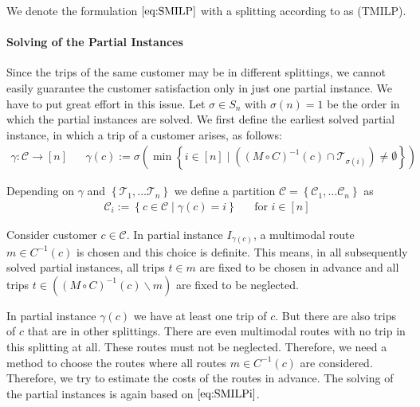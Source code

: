 We denote the formulation $\eqref{eq:SMILP}$ with a splitting according to  as (TMILP).

\paragraph{Solving of the Partial Instances} \parfill

Since the trips of the same customer may be in different splittings, we cannot easily guarantee the customer satisfaction only in just one partial instance. We have to put great effort in this issue. Let $\sigma\in S_n$ with $\sigma(n)=1$ be the order in which the partial instances are solved. We first define the earliest solved partial instance, in which a trip of a customer arises, as follows: 
\begin{align*}
	\gamma: \mathcal{C}\to[n] && \gamma(c):=\sigma\left(\min\left\{i\in[n]\mid\left((M\circ C)^{-1}(c)\cap\mathcal{T}_{\sigma(i)}\right)\neq\emptyset\right\}\right)
\end{align*}

Depending on $\gamma$ and $\left\{\mathcal{T}_1,\dots\mathcal{T}_n\right\}$ we define a partition $\mathcal{C}=\left\{\mathcal{C}_1,\dots\mathcal{C}_n\right\}$ as
\begin{align*}
	\mathcal{C}_i := \left\{c\in\mathcal{C}\mid \gamma(c)=i\right\} && \text{for } i\in[n]
\end{align*}

Consider customer $c\in\mathcal{C}$. In partial instance $I_{\gamma(c)}$, a multimodal route $m\in C^{-1}(c)$ is chosen and this choice is definite. This means, in all subsequently solved partial instances, all trips ${t\in m}$ are fixed to be chosen in advance and all trips ${t\in\left((M\circ C)^{-1}(c)\backslash m\right)}$ are fixed to be neglected.

In partial instance $\gamma(c)$ we have at least one trip of $c$. But there are also trips of $c$ that are in other splittings. There are even multimodal routes with no trip in this splitting at all. These routes must not be neglected. Therefore, we need a method to choose the routes where all routes $m\in C^{-1}(c)$ are considered. Therefore, we try to estimate the costs of the routes in advance. The solving of the partial instances is again based on $\eqref{eq:SMILPi}$.

